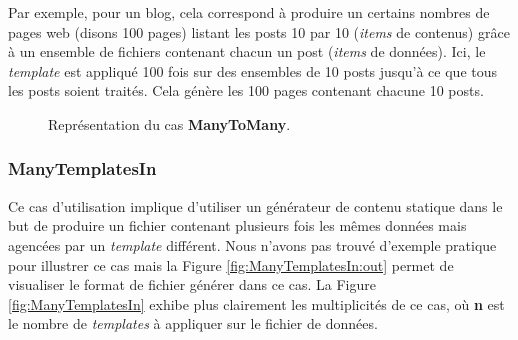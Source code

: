 			\begin{exmpl}
				\label{exmpl:ManyToMany}
				 Par exemple, pour un blog, cela correspond à produire un certains nombres de pages web (disons 100 pages) listant les posts 10 par 10 (\textit{items} de contenus) grâce à un ensemble de fichiers contenant chacun un post (\textit{items} de données). Ici, le \textit{template} est appliqué 100 fois sur des ensembles de 10 posts jusqu'à ce que tous les posts soient traités. Cela génère les 100 pages contenant chacune 10 posts.  
			\end{exmpl}
			
			\begin{figure}[!]
				\begin{center}
					\caption{Représentation du cas \textbf{ManyToMany}.}
					\label{fig:ManyToMany}
				\end{center}
			\end{figure}
		
		
		\newpage
		
		\subsubsection*{ManyTemplatesIn}
			Ce cas d'utilisation implique  d'utiliser un générateur de contenu statique dans le but de produire un fichier contenant plusieurs fois les mêmes données mais agencées par un \textit{template} différent. Nous n'avons pas trouvé d'exemple pratique pour illustrer ce cas mais la Figure \ref{fig:ManyTemplatesIn:out} permet de visualiser le format de fichier générer dans ce cas. La Figure \ref{fig:ManyTemplatesIn} exhibe plus clairement les multiplicités de ce cas, où \textbf{n} est le nombre de \textit{templates} à appliquer sur le fichier de données.
			
